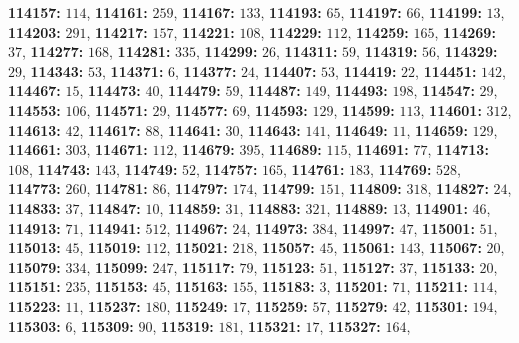 \textsf{\bfseries 114157:} $114$, \textsf{\bfseries 114161:} $259$, \textsf{\bfseries 114167:} $133$, \textsf{\bfseries 114193:} $65$, \textsf{\bfseries 114197:} $66$, \textsf{\bfseries 114199:} $13$, \textsf{\bfseries 114203:} $291$, \textsf{\bfseries 114217:} $157$, \textsf{\bfseries 114221:} $108$, \textsf{\bfseries 114229:} $112$, \textsf{\bfseries 114259:} $165$, \textsf{\bfseries 114269:} $37$, \textsf{\bfseries 114277:} $168$, \textsf{\bfseries 114281:} $335$, \textsf{\bfseries 114299:} $26$, \textsf{\bfseries 114311:} $59$, \textsf{\bfseries 114319:} $56$, \textsf{\bfseries 114329:} $29$, \textsf{\bfseries 114343:} $53$, \textsf{\bfseries 114371:} $6$, \textsf{\bfseries 114377:} $24$, \textsf{\bfseries 114407:} $53$, \textsf{\bfseries 114419:} $22$, \textsf{\bfseries 114451:} $142$, \textsf{\bfseries 114467:} $15$, \textsf{\bfseries 114473:} $40$, \textsf{\bfseries 114479:} $59$, \textsf{\bfseries 114487:} $149$, \textsf{\bfseries 114493:} $198$, \textsf{\bfseries 114547:} $29$, \textsf{\bfseries 114553:} $106$, \textsf{\bfseries 114571:} $29$, \textsf{\bfseries 114577:} $69$, \textsf{\bfseries 114593:} $129$, \textsf{\bfseries 114599:} $113$, \textsf{\bfseries 114601:} $312$, \textsf{\bfseries 114613:} $42$, \textsf{\bfseries 114617:} $88$, \textsf{\bfseries 114641:} $30$, \textsf{\bfseries 114643:} $141$, \textsf{\bfseries 114649:} $11$, \textsf{\bfseries 114659:} $129$, \textsf{\bfseries 114661:} $303$, \textsf{\bfseries 114671:} $112$, \textsf{\bfseries 114679:} $395$, \textsf{\bfseries 114689:} $115$, \textsf{\bfseries 114691:} $77$, \textsf{\bfseries 114713:} $108$, \textsf{\bfseries 114743:} $143$, \textsf{\bfseries 114749:} $52$, \textsf{\bfseries 114757:} $165$, \textsf{\bfseries 114761:} $183$, \textsf{\bfseries 114769:} $528$, \textsf{\bfseries 114773:} $260$, \textsf{\bfseries 114781:} $86$, \textsf{\bfseries 114797:} $174$, \textsf{\bfseries 114799:} $151$, \textsf{\bfseries 114809:} $318$, \textsf{\bfseries 114827:} $24$, \textsf{\bfseries 114833:} $37$, \textsf{\bfseries 114847:} $10$, \textsf{\bfseries 114859:} $31$, \textsf{\bfseries 114883:} $321$, \textsf{\bfseries 114889:} $13$, \textsf{\bfseries 114901:} $46$, \textsf{\bfseries 114913:} $71$, \textsf{\bfseries 114941:} $512$, \textsf{\bfseries 114967:} $24$, \textsf{\bfseries 114973:} $384$, \textsf{\bfseries 114997:} $47$, \textsf{\bfseries 115001:} $51$, \textsf{\bfseries 115013:} $45$, \textsf{\bfseries 115019:} $112$, \textsf{\bfseries 115021:} $218$, \textsf{\bfseries 115057:} $45$, \textsf{\bfseries 115061:} $143$, \textsf{\bfseries 115067:} $20$, \textsf{\bfseries 115079:} $334$, \textsf{\bfseries 115099:} $247$, \textsf{\bfseries 115117:} $79$, \textsf{\bfseries 115123:} $51$, \textsf{\bfseries 115127:} $37$, \textsf{\bfseries 115133:} $20$, \textsf{\bfseries 115151:} $235$, \textsf{\bfseries 115153:} $45$, \textsf{\bfseries 115163:} $155$, \textsf{\bfseries 115183:} $3$, \textsf{\bfseries 115201:} $71$, \textsf{\bfseries 115211:} $114$, \textsf{\bfseries 115223:} $11$, \textsf{\bfseries 115237:} $180$, \textsf{\bfseries 115249:} $17$, \textsf{\bfseries 115259:} $57$, \textsf{\bfseries 115279:} $42$, \textsf{\bfseries 115301:} $194$, \textsf{\bfseries 115303:} $6$, \textsf{\bfseries 115309:} $90$, \textsf{\bfseries 115319:} $181$, \textsf{\bfseries 115321:} $17$, \textsf{\bfseries 115327:} $164$, 
